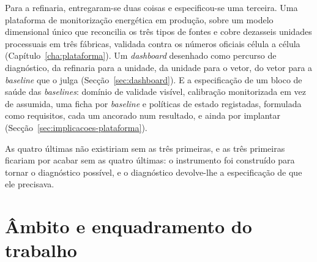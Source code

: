 Para a refinaria, entregaram-se duas coisas e especificou-se uma
terceira. Uma plataforma de monitorização energética em produção, sobre
um modelo dimensional único que reconcilia os três tipos de fontes e cobre
dezasseis unidades processuais em três fábricas, validada contra os números oficiais célula a célula
(Capítulo~\ref{cha:plataforma}). Um
\emph{dashboard} desenhado como percurso de diagnóstico, da refinaria
para a unidade, da unidade para o vetor, do vetor para a \emph{baseline}
que o julga (Secção~\ref{sec:dashboard}). E a especificação de um bloco
de saúde das \emph{baselines}: domínio de
validade visível, calibração monitorizada em vez de assumida, uma ficha
por \emph{baseline} e políticas de estado registadas, formulada como
requisitos, cada um ancorado num resultado, e ainda por implantar
(Secção~\ref{sec:implicacoes-plataforma}).


As quatro últimas não existiriam sem as três primeiras, e as três
primeiras ficariam por acabar sem as quatro últimas: o instrumento foi
construído para tornar o diagnóstico possível, e o diagnóstico
devolve-lhe a especificação de que ele precisava.

\section{Âmbito e enquadramento do trabalho}
\label{sec:ambito}

